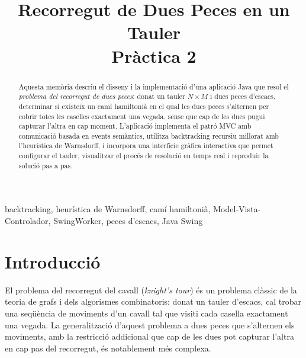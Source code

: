 \documentclass[conference,compsoc]{IEEEtran}
\begin{document}
\title{Recorregut de Dues Peces en un Tauler\\ Pràctica 2}

\author{
}

\maketitle

\begin{strip}
\begin{abstract}
Aquesta memòria descriu el disseny i la implementació d'una aplicació Java
que resol el \textit{problema del recorregut de dues peces}: donat un tauler
$N \times M$ i dues peces d'escacs, determinar si existeix un camí hamiltonià
en el qual les dues peces s'alternen per cobrir totes les caselles exactament
una vegada, sense que cap de les dues pugui capturar l'altra en cap moment.
L'aplicació implementa el patró MVC amb comunicació basada en events semàntics,
utilitza backtracking recursiu millorat amb l'heurística de Warnsdorff, i
incorpora una interfície gràfica interactiva que permet configurar el tauler,
visualitzar el procés de resolució en temps real i reproduir la solució pas a pas.
\end{abstract}

\begin{IEEEkeywords}
backtracking, heurística de Warnsdorff, camí hamiltonià, Model-Vista-Controlador, SwingWorker, peces d'escacs, Java Swing
\end{IEEEkeywords}
\end{strip}

\IEEEpeerreviewmaketitle

\section{Introducció}

El problema del recorregut del cavall (\textit{knight's tour}) és un
problema clàssic de la teoria de grafs i dels algorismes combinatoris:
donat un tauler d'escacs, cal trobar una seqüència de moviments d'un
cavall tal que visiti cada casella exactament una
vegada. La generalització d'aquest problema a dues
peces que s'alternen els moviments, amb la restricció addicional que
cap de les dues pot capturar l'altra en cap pas del recorregut, és
notablement més complexa.
\end{document}
